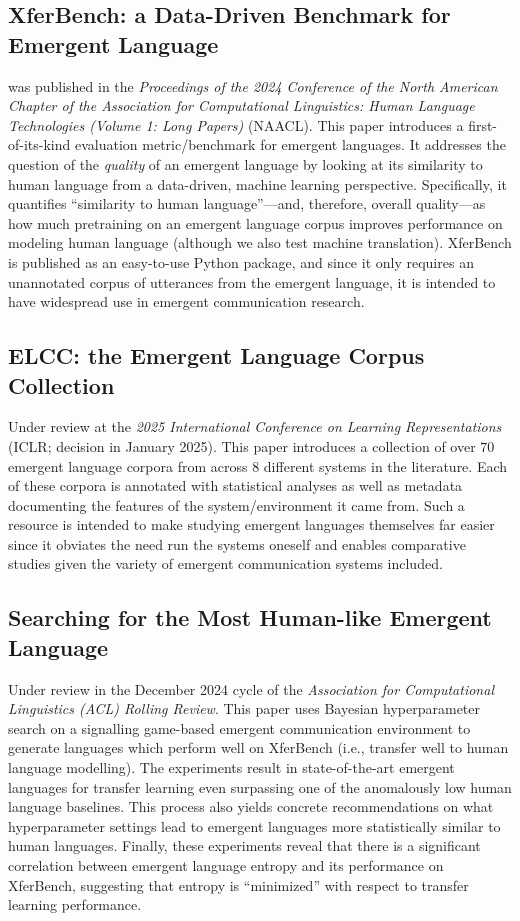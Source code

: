 \subsection{XferBench: a Data-Driven Benchmark for Emergent Language}
\noindent
\citet{xferbench} was published in the \textit{Proceedings of the 2024 Conference of the North American Chapter of the Association for Computational Linguistics: Human Language Technologies (Volume 1: Long Papers)} (NAACL).
This paper introduces a first-of-its-kind evaluation metric/benchmark for emergent languages.
It addresses the question of the \emph{quality} of an emergent language by looking at its similarity to human language from a data-driven, machine learning perspective.
Specifically, it quantifies ``similarity to human language''---and, therefore, overall quality---as how much pretraining on an emergent language corpus improves performance on modeling human language (although we also test machine translation).
XferBench is published as an easy-to-use Python package, and since it only requires an unannotated corpus of utterances from the emergent language, it is intended to have widespread use in emergent communication research.


\subsection{ELCC: the Emergent Language Corpus Collection}
Under review at the \textit{2025 International Conference on Learning Representations} (ICLR; decision in January 2025).
This paper introduces a collection of over $70$ emergent language corpora from across $8$ different systems in the literature.
Each of these corpora is annotated with statistical analyses as well as metadata documenting the features of the system/environment it came from.
Such a resource is intended to make studying emergent languages themselves far easier since it obviates the need run the systems oneself and enables comparative studies given the variety of emergent communication systems included.

\subsection{Searching for the Most Human-like Emergent Language}
Under review in the December 2024 cycle of the \emph{Association for Computational Linguistics (ACL) Rolling Review}.
This paper uses Bayesian hyperparameter search on a signalling game-based emergent communication environment to generate languages which perform well on XferBench (i.e., transfer well to human language modelling).
The experiments result in state-of-the-art emergent languages for transfer learning even surpassing one of the anomalously low human language baselines.
This process also yields concrete recommendations on what hyperparameter settings lead to emergent languages more statistically similar to human languages.
Finally, these experiments reveal that there is a significant correlation between emergent language entropy and its performance on XferBench, suggesting that entropy is ``minimized'' with respect to transfer learning performance.

